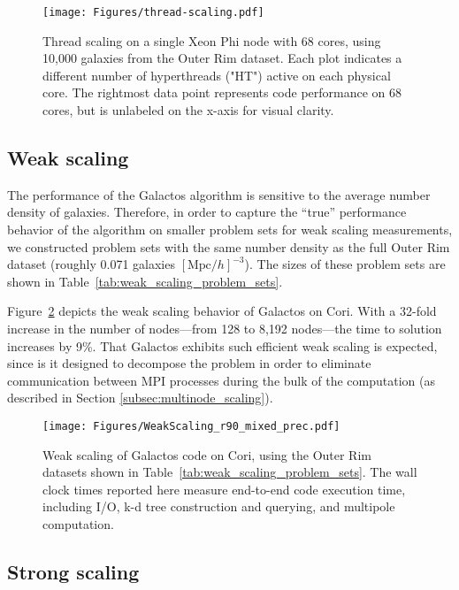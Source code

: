 \begin{figure}
\centering
\texttt{[image: Figures/thread-scaling.pdf]}
    \caption{Thread scaling on a single Xeon Phi node with 68 cores, using 10,000 galaxies from the Outer Rim dataset. Each plot indicates a different number of hyperthreads ("HT") active on each physical core. The rightmost data point represents code performance on 68 cores, but is unlabeled on the x-axis for visual clarity.}
\label{fig:thread-scaling}
\end{figure}




\subsection{Weak scaling}
\label{sec:weak-scaling}

The performance of the Galactos algorithm is sensitive to the average number density of galaxies.
Therefore, in order to capture the ``true'' performance behavior of the algorithm on smaller problem sets for weak scaling measurements, we constructed problem sets with the same number density as the full Outer Rim dataset (roughly 0.071 galaxies $[\text{Mpc}/h]^{-3}$). 
The sizes of these problem sets are shown in Table~\ref{tab:weak_scaling_problem_sets}.

Figure~\ref{fig:weak-scaling} depicts the weak scaling behavior of Galactos on Cori.
With a 32-fold increase in the number of nodes---from 128 to 8,192 nodes---the time to solution increases by 9\%.
That Galactos exhibits such efficient weak scaling is expected, since is it designed to decompose the problem in order to eliminate communication between MPI processes during the bulk of the computation (as described in Section \ref{subsec:multinode_scaling}).


\begin{figure}
\centering
\texttt{[image: Figures/WeakScaling\_r90\_mixed\_prec.pdf]}
    \caption{Weak scaling of Galactos code on Cori, using the Outer Rim datasets shown in Table~\ref{tab:weak_scaling_problem_sets}.
             The wall clock times reported here measure end-to-end code execution time, including I/O, k-d tree construction and querying, and multipole computation.}
\label{fig:weak-scaling}
\end{figure}





\subsection{Strong scaling}
\label{sec:strong-scaling}

